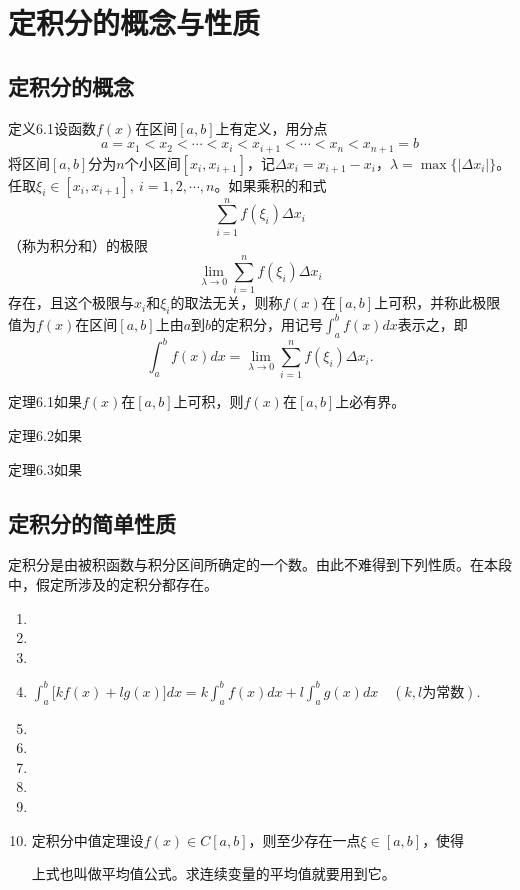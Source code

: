 
\section{定积分的概念与性质}
\subsection{定积分的概念}

定义6.1\quad 设函数$f(x)$在区间$[a,b]$上有定义，用分点
\[
a=x_1<x_2<\cdots<x_i<x_{i+1}<\cdots<x_n<x_{n+1}=b
\]
将区间$[a,b]$分为$n$个小区间$[x_i,x_{i+1}]$，记$\Delta x_i=x_{i+1}-x_i$，$\lambda=\max\{|\Delta x_i|\}$。任取$\xi_i\in[x_i,x_{i+1}],\ i=1,2,\cdots,n$。如果乘积的和式
\[
\sum_{i=1}^{n}f(\xi_i)\Delta x_i
\]
（称为积分和）的极限
\[
\lim_{\lambda\to0}\sum_{i=1}^{n}f(\xi_i)\Delta x_i
\]
存在，且这个极限与$x_i$和$\xi_i$的取法无关，则称$f(x)$在$[a,b]$上可积，并称此极限值为$f(x)$在区间$[a,b]$上由$a$到$b$的定积分，用记号$\int _a^bf(x)dx$表示之，即
\[
\int _a^bf(x)dx=\lim_{\lambda\to0}\sum_{i=1}^{n}f(\xi_i)\Delta x_i.
\]

定理6.1\quad 如果$f(x)$在$[a,b]$上可积，则$f(x)$在$[a,b]$上必有界。

定理6.2\quad 如果

定理6.3\quad 如果

\subsection{定积分的简单性质}
定积分是由被积函数与积分区间所确定的一个数。由此不难得到下列性质。在本段中，假定所涉及的定积分都存在。
\begin{enumerate}
    \item 
    \item 
    \item 
    \item $\int_a^b\bigl[kf(x)+lg(x)\bigr]dx=k\int_a^bf(x)dx+l\int_a^bg(x)dx\quad(k,l为常数).$
    \item 
    \item 
    \item 
    \item 
    \item 
    \item 定积分中值定理\quad 设$f(x)\in C[a,b]$，则至少存在一点$\xi\in[a,b]$，使得

上式也叫做平均值公式。求连续变量的平均值就要用到它。
\end{enumerate}

